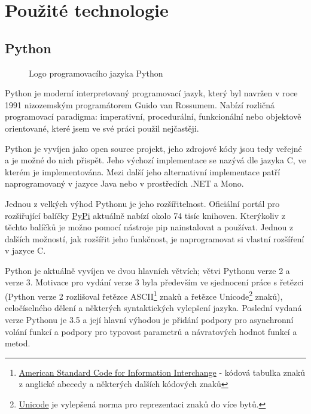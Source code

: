 \section{Použité technologie}

\subsection{Python}

\begin{wrapfigure}{R}{0.5\textwidth}
 \centering
 
 \caption{Logo programovacího jazyka Python}
\end{wrapfigure}

Python je moderní interpretovaný programovací jazyk, který byl navržen v roce 1991 nizozemským programátorem Guido van Rossumem. Nabízí rozličná programovací paradigma: imperativní, procedurální, funkcionální nebo objektově orientované, které jsem ve své práci použil nejčastěji.

Python je vyvíjen jako open source projekt, jeho zdrojové kódy jsou tedy veřejné a je možné do nich přispět. Jeho výchozí implementace se nazývá  dle jazyka C, ve kterém je implementována. Mezi další jeho alternativní implementace patří  naprogramovaný v jazyce Java nebo  v prostředích .NET a Mono.

Jednou z velkých výhod Pythonu je jeho rozšířitelnost. Oficiální portál pro rozšiřující balíčky \href{https:\/\/pypi.python.org\/pypi}{PyPi} aktuálně nabízí okolo 74 tisíc knihoven. Kterýkoliv z těchto balíčků je možno pomocí nástroje pip nainstalovat a používat. Jednou z dalších možností, jak rozšířit jeho funkčnost, je naprogramovat si vlastní rozšíření v jazyce C.

Python je aktuálně vyvíjen ve dvou hlavních větvích; větvi Pythonu verze 2 a verze 3. Motivace pro vydání verze 3 byla především ve sjednocení práce s řetězci (Python verze 2 rozlišoval řetězce ASCII\footnote{\href{https://cs.wikipedia.org/wiki/ASCII}{American Standard Code for Information Interchange} - kódová tabulka znaků z anglické abecedy a některých dalších kódových znaků} znaků a řetězce Unicode\footnote{\href{https://cs.wikipedia.org/wiki/Unicode}{Unicode} je vylepšená norma pro reprezentaci znaků do více bytů.} znaků), celočíselného dělení a některých syntaktických vylepšení jazyka. Poslední vydaná verze Pythonu je 3.5 a její hlavní výhodou je přidání podpory pro asynchronní volání funkcí a podpory pro typovost parametrů a návratových hodnot funkcí a metod.

